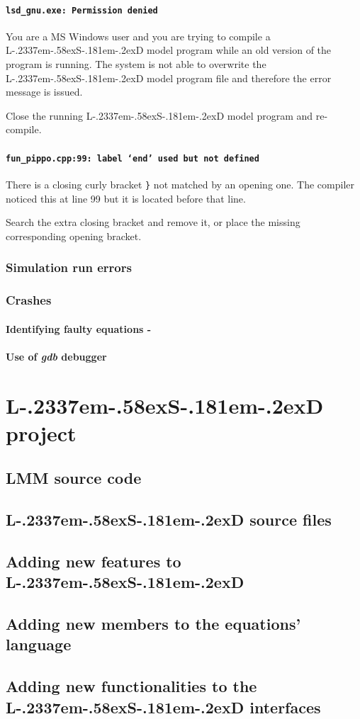 \documentclass [11pt,a4paper] {book}
\def\LsD{{L\kern-.2337em\lower-.58ex\hbox{S}\kern-.181em\lower-.2ex\hbox{D}}\xspace}
\begin{document}
\subsubsection{\texttt{lsd\_gnu.exe: Permission denied }}

You are a MS Windows user and you are trying to compile a \LsD model program while an old
version of the program is running. The system is not able to overwrite the \LsD model
program file and therefore the error message is issued.

Close the running \LsD model program and re-compile.

\subsubsection{\texttt{fun\_pippo.cpp:99: label `end' used but not defined}}

There is a closing curly bracket \texttt{\}} not matched by an opening one. The compiler
noticed this at line 99 but it is located before that line.

Search the extra closing bracket and remove it, or place the missing corresponding
opening bracket.



\subsection{Simulation run errors}

\subsection{Crashes}

\subsubsection{Identifying faulty equations -  }
\subsubsection{Use of \textit{gdb} debugger}


\chapter{\LsD project}\label{ch:project}

\section{LMM source code}\label{sec:srcLMM}
\section{\LsD source files}\label{sec:srclsd}
\section{Adding new features to \LsD}\label{sec:newfea}
\section{Adding new members to the equations' language}\label{sec:newcom}
\section{Adding new functionalities to the \LsD interfaces}\label{sec:newmenu}
\end{document}
